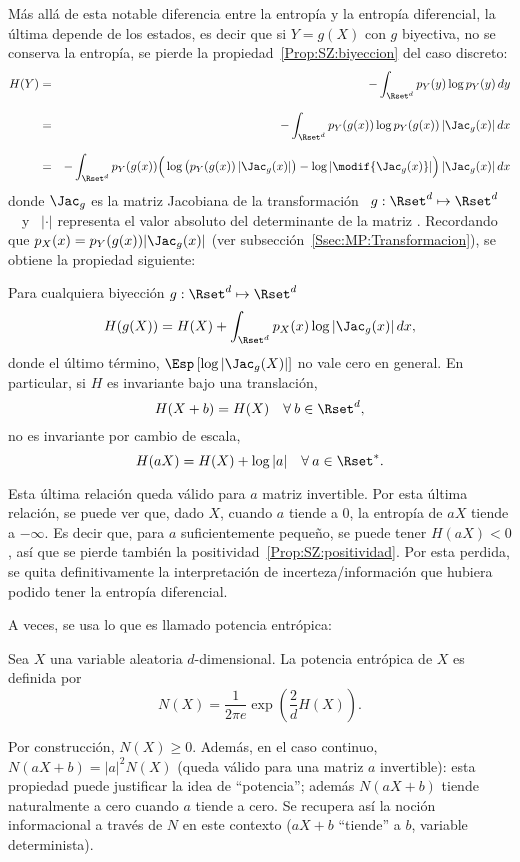 M\'as  all\'a de esta  notable diferencia  entre la  entrop\'ia y  la entrop\'ia
diferencial, la \'ultima depende de los estados,  es decir que si $Y = g(X)$ con
$g$   biyectiva,   no   se   conserva   la  entrop\'ia,   \ie   se   pierde   la
propiedad~\ref{Prop:SZ:biyeccion} del caso discreto:
%
\begin{eqnarray*}
H(Y) & = & - \int_{\Rset^d} p_Y(y) \log p_Y(y) \, dy\\[2.5mm]
%
& = &  - \int_{\Rset^d} p_Y(g(x)) \log p_Y(g(x)) \, |\Jac_g(x)| \, dx\\[2.5mm]
%
& = & - \int_{\Rset^d} p_Y(g(x)) \Big( \log \big( p_Y(g(x)) \, |\Jac_g(x)| \big) -
\log |\modif{\Jac_g(x)}| \Big) \, |\Jac_g(x)| \, dx
\end{eqnarray*}
%
donde  $\Jac_g$ es  la matriz  Jacobiana de  la transformaci\'on  \  $g: \Rset^d
\mapsto \Rset^d$ \ \ y \ $|\cdot|$ representa el valor absoluto del determinante
de   la  matriz .   Recordando   que  $p_X(x)   =  p_Y(g(x))   |\Jac_g(x)|$  (ver
subsecci\'on~\ref{Ssec:MP:Transformacion}),
se obtiene la propiedad siguiente:
%
\begin{propiedadesC}\setcounter{enumi}{\value{PropBiyeccion}}
%
\item\label{Prop:SZ:biyeccionC}
Para  cualquiera biyecci\'on $g:  \Rset^d \mapsto  \Rset^d$
  \[
  H(g(X)) = H(X) + \int_{\Rset^d} p_X(x) \log |\Jac_g(x)| \, dx,
  \]
  donde el \'ultimo t\'ermino, $\Esp\left[  \log |\Jac_g(X)| \right]$ no vale cero
  en general.  En particular, si $H$ es invariante bajo una translaci\'on,
  \[
  H(X+b) = H(X) \quad \forall \: b \in \Rset^d,
  \]
  no  es invariante  por cambio  de escala,
  \[
  H(a X) = H(X) + \log |a| \quad \forall \: a \in \Rset^*.
  \]
\end{propiedadesC}
%
Esta \'ultima  relaci\'on queda v\'alido  para $a$ matriz invertible.   Por esta
\'ultima  relaci\'on, se puede  ver que,  dado $X$,  cuando $a$  tiende a  0, la
entrop\'ia de $a X$ tiende a  $-\infty$.  Es decir que, para $a$ suficientemente
peque\~no,  se puede  tener  $H(a X)  < 0$,  as\'i  que se  pierde tambi\'en  la
positividad~\ref{Prop:SZ:positividad}.     Por    esta    perdida,   se    quita
definitivamente  la  interpretaci\'on  de  incerteza/informaci\'on  que  hubiera
podido tener la entrop\'ia diferencial.

A veces, se usa lo que es llamado potencia entr\'opica:
%
\begin{definicion}
\label{Def:SZ:PotenciaEntropica}
%
  Sea $X$ una variable aleatoria $d$-dimensional. La potencia entr\'opica de $X$
  es definida por
  \[
  N(X) = \frac{1}{2 \pi e} \exp\left( \frac2d H(X) \right).
  \]
\end{definicion}
%
\noindent Por construcci\'on, $N(X) \ge 0$.  Adem\'as, en el caso continuo, $N(a
X+b)  =  |a|^2 N(X)$  (queda  v\'alido para  una  matriz  $a$ invertible):  esta
propiedad puede justificar  la idea de ``potencia''; adem\'as  $N(a X+b)$ tiende
naturalmente a  cero cuando $a$  tiende a cero.   Se recupera as\'i  la noci\'on
informacional a trav\'es  de $N$ en este  contexto ($a X + b$  ``tiende'' a $b$,
variable determinista).

